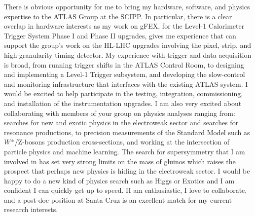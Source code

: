 

There is obvious opportunity for me to bring my hardware, software, and physics expertise to the ATLAS Group at the SCIPP. In particular, there is a clear overlap in hardware interests as my work on gFEX, for the Level-1 Calorimeter Trigger System Phase I and Phase II upgrades, gives me experience that can support the group's work on the HL-LHC upgrades involving the pixel, strip, and high-granularity timing detector. My experience with trigger and data acquisition is broad, from running trigger shifts in the ATLAS Control Room, to designing and implementing a Level-1 Trigger subsystem, and developing the slow-control and monitoring infrastructure that interfaces with the existing ATLAS system. I would be excited to help participate in the testing, integration, commissioning, and installation of the instrumentation upgrades. I am also very excited about collaborating with members of your group on physics analyses ranging from: searches for new and exotic physics in the electroweak sector and searches for resonance productions, to precision measurements of the Standard Model such as $W^\pm$/Z-bosons production cross-sections, and working at the intersection of particle physics and machine learning. The search for supersymmetry that I am involved in has set very strong limits on the mass of gluinos which raises the prospect that perhaps new physics is hiding in the electroweak sector. I would be happy to do a new kind of physics search such as Higgs or Exotics and I am confident I can quickly get up to speed. II am enthusiastic, I love to collaborate, and a post-doc position at Santa Cruz is an excellent match for my current research interests.


